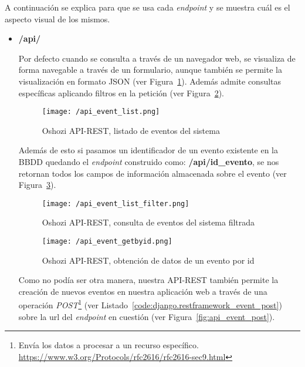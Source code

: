 A continuación se explica para que se usa cada \textit{endpoint} y se muestra cuál es el aspecto visual de los mismos.

\begin{itemize}
\item \textbf{/api/} 

Por defecto cuando se consulta a través de un navegador web, se visualiza de forma navegable a través de un formulario, aunque también se permite la visualización en formato \acs{JSON} (ver Figura~\ref{fig:api_event_list}). Además admite consultas específicas aplicando filtros en la petición (ver Figura~\ref{fig:api_event_list_filter}).

\begin{figure}[!h]
\centering
\texttt{[image: /api\_event\_list.png]}
\caption{Oshozi \acs{API}-\acs{REST}, listado de eventos del sistema}
\label{fig:api_event_list}
\end{figure}

Además de esto si pasamos un identificador de un evento existente en la \acs{BBDD} quedando el \textit{endpoint} construido como: \textbf{/api/id\_evento}, se nos retornan todos los campos de información almacenada sobre el evento (ver Figura~\ref{fig:api_event_getbyid}).

\begin{figure}[!h]
\centering
\texttt{[image: /api\_event\_list\_filter.png]}
\caption{Oshozi \acs{API}-\acs{REST}, consulta de eventos del sistema filtrada}
\label{fig:api_event_list_filter}
\end{figure}

\begin{figure}[!h]
\centering
\texttt{[image: /api\_event\_getbyid.png]}
\caption{Oshozi \acs{API}-\acs{REST}, obtención de datos de un evento por id}
\label{fig:api_event_getbyid}
\end{figure}

Como no podía ser otra manera, nuestra \acs{API}-\acs{REST} también permite la creación de nuevos eventos en nuestra aplicación web a través de una operación \textit{POST}\footnote{Envía los datos a procesar a un recurso específico. \url{https://www.w3.org/Protocols/rfc2616/rfc2616-sec9.html}} (ver Listado~\ref{code:django.restframework_event_post}) sobre la url del \textit{endpoint} en cuestión (ver Figura~\ref{fig:api_event_post}).





\end{itemize}
